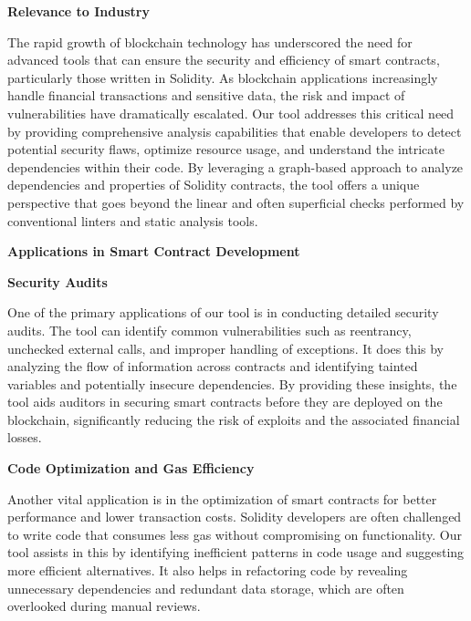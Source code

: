     {

        \textbf{Relevance to Industry}

        The rapid growth of blockchain technology has underscored the need for advanced tools that can ensure the
        security and efficiency of smart contracts, particularly those written in Solidity. As blockchain applications
        increasingly handle financial transactions and sensitive data, the risk and impact of vulnerabilities have dramatically
        escalated. Our tool addresses this critical need by providing comprehensive analysis capabilities that enable developers
        to detect potential security flaws, optimize resource usage, and understand the intricate dependencies within
        their code. By leveraging a graph-based approach to analyze dependencies and properties of Solidity contracts,
        the tool offers a unique perspective that goes beyond the linear and often superficial checks performed by
        conventional linters and static analysis tools.

        \textbf{Applications in Smart Contract Development}

        \textbf{Security Audits}

        One of the primary applications of our tool is in conducting detailed security audits.
        The tool can identify common vulnerabilities such as reentrancy, unchecked external calls, and improper handling
        of exceptions.
        It does this by analyzing the flow of information across contracts and identifying tainted
        variables and potentially insecure dependencies.
        By providing these insights, the tool aids auditors in securing
        smart contracts before they are deployed on the blockchain, significantly reducing the risk of exploits and the
        associated financial losses.

        \textbf{Code Optimization and Gas Efficiency}

        Another vital application is in the optimization of smart contracts for better performance and lower transaction
        costs.
        Solidity developers are often challenged to write code that consumes less gas without compromising on
        functionality.
        Our tool assists in this by identifying inefficient patterns in code usage and suggesting more
        efficient alternatives.
        It also helps in refactoring code by revealing unnecessary dependencies and redundant
        data storage, which are often overlooked during manual reviews.

}
